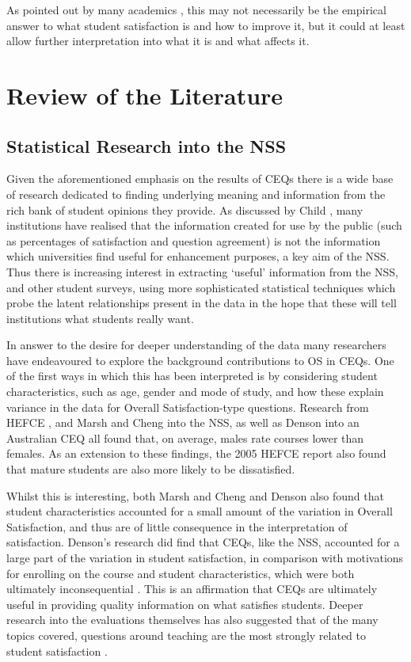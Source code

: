 \documentclass[11pt,a4paper]{report}
\begin{document}
 As pointed out by many academics \cite{AbolishNSS2015,NSSworthless2008,NSSpainorgain2009}, this may not necessarily be the empirical answer to what student satisfaction is and how to improve it, but it could at least allow further interpretation into what it is and what affects it. 

\newpage
\chapter{Review of the Literature} \label{lit review} 
\section{Statistical Research into the NSS}
Given the aforementioned emphasis on the results of \ac{CEQ}s there is a wide base of research dedicated to finding underlying meaning and information from the rich bank of student opinions they provide. As discussed by Child \cite{child2011perception}, many institutions have realised that the information created for use by the public (such as percentages of satisfaction and question agreement) is not the information which universities find useful for enhancement purposes, a key aim of the \ac{NSS}. Thus there is increasing interest in extracting `useful' information from the \ac{NSS}, and other student surveys, using more sophisticated statistical techniques which probe the latent relationships present in the data in the hope that these will tell institutions what students really want. 

In answer to the desire for deeper understanding of the data many researchers have endeavoured to explore the background contributions to \ac{OS} in \ac{CEQ}s. One of the first ways in which this has been interpreted is by considering student characteristics, such as age, gender and mode of study, and how these explain variance in the data for Overall Satisfaction-type questions. Research from \ac{HEFCE} \cite{surridge2005-2007}, and Marsh and Cheng \cite{marshandcheng2008} into the \ac{NSS}, as well as Denson \cite{denson2010whatpredicts} into an Australian \ac{CEQ} all found that, on average, males rate courses lower than females. As an extension to these findings, the 2005 HEFCE \cite{2007initialnss} report also found that mature students are also more likely to be dissatisfied. 

Whilst this is interesting, both Marsh and Cheng \cite{marshandcheng2008} and Denson \cite{denson2010whatpredicts} also found that student characteristics accounted for a small amount of the variation in Overall Satisfaction, and thus are of little consequence in the interpretation of satisfaction. Denson's research did find that \ac{CEQ}s, like the NSS, accounted for a large part of the variation in student satisfaction, in comparison with motivations for enrolling on the course and student characteristics, which were both ultimately inconsequential \cite{denson2010whatpredicts}. This is an affirmation that \ac{CEQ}s are ultimately useful in providing quality information on what satisfies students. Deeper research into the evaluations themselves has also suggested that of the many topics covered, questions around teaching are the most strongly related to student satisfaction \cite{ginns2007students}.
\end{document}
